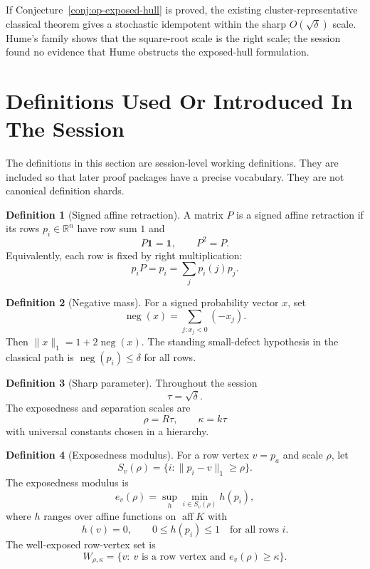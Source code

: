 \documentclass[11pt]{article}
\newcommand{\R}{\mathbb{R}}
\newcommand{\one}{\mathbf{1}}
\newcommand{\negm}{\operatorname{neg}}
\theoremstyle{definition}
\newtheorem{definition}{Definition}
\begin{document}
If Conjecture~\ref{conj:op-exposed-hull} is proved, the existing
cluster-representative classical theorem gives a stochastic idempotent within
the sharp \(O(\sqrt{\delta})\) scale.  Hume's family shows that the square-root
scale is the right scale; the session found no evidence that Hume obstructs
the exposed-hull formulation.

\section{Definitions Used Or Introduced In The Session}

The definitions in this section are session-level working definitions.  They
are included so that later proof packages have a precise vocabulary.  They
are not canonical definition shards.

\begin{definition}[Signed affine retraction]
A matrix \(P\) is a signed affine retraction if its rows \(p_i\in\R^n\) have
row sum \(1\) and
\[
  P\one=\one,\qquad P^2=P.
\]
Equivalently, each row is fixed by right multiplication:
\[
  p_iP=p_i=\sum_j p_i(j)p_j.
\]
\end{definition}

\begin{definition}[Negative mass]
For a signed probability vector \(x\), set
\[
  \negm(x)=\sum_{j:x_j<0}(-x_j).
\]
Then \(\|x\|_1=1+2\negm(x)\).  The standing small-defect hypothesis in the
classical path is \(\negm(p_i)\leq\delta\) for all rows.
\end{definition}

\begin{definition}[Sharp parameter]
Throughout the session
\[
  \tau=\sqrt{\delta}.
\]
The exposedness and separation scales are
\[
  \rho=R\tau,\qquad \kappa=k\tau
\]
with universal constants chosen in a hierarchy.
\end{definition}

\begin{definition}[Exposedness modulus]
For a row vertex \(v=p_a\) and scale \(\rho\), let
\[
  S_v(\rho)=\{i:\|p_i-v\|_1\geq\rho\}.
\]
The exposedness modulus is
\[
  e_v(\rho)=\sup_h\min_{i\in S_v(\rho)}h(p_i),
\]
where \(h\) ranges over affine functions on \(\operatorname{aff}K\) with
\[
  h(v)=0,\qquad 0\leq h(p_i)\leq 1\quad\text{for all rows }i.
\]
The well-exposed row-vertex set is
\[
  W_{\rho,\kappa}=\{v:\ v\text{ is a row vertex and }e_v(\rho)\geq\kappa\}.
\]
\end{definition}
\end{document}
